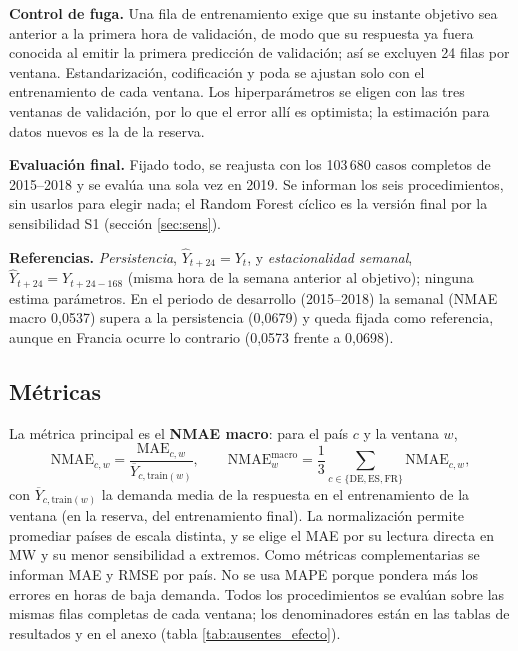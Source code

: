 \begin{table}[!htbp]
    \centering
        \caption{Ventanas de validación temporal y tamaños (casos completos, suma de los tres países).}
        \label{tab:ventanas}
        \small
        
\end{table}

\textbf{Control de fuga.} Una fila de entrenamiento exige que su instante objetivo sea anterior a la primera hora de validación, de modo que su respuesta ya fuera conocida al emitir la primera predicción de validación; así se excluyen 24 filas por ventana. Estandarización, codificación y poda se ajustan solo con el entrenamiento de cada ventana. Los hiperparámetros se eligen con las tres ventanas de validación, por lo que el error allí es optimista; la estimación para datos nuevos es la de la reserva.

\textbf{Evaluación final.} Fijado todo, se reajusta con los 103\,680 casos completos de 2015--2018 y se evalúa una sola vez en 2019. Se informan los seis procedimientos, sin usarlos para elegir nada; el Random Forest cíclico es la versión final por la sensibilidad S1 (sección \ref{sec:sens}).

\textbf{Referencias.} \emph{Persistencia}, $\widehat Y_{t+24}=Y_t$, y \emph{estacionalidad semanal}, $\widehat Y_{t+24}=Y_{t+24-168}$ (misma hora de la semana anterior al objetivo); ninguna estima parámetros. En el periodo de desarrollo (2015--2018) la semanal (NMAE macro 0,0537) supera a la persistencia (0,0679) y queda fijada como referencia, aunque en Francia ocurre lo contrario (0,0573 frente a 0,0698).

\subsection{Métricas}

La métrica principal es el \textbf{NMAE macro}: para el país $c$ y la ventana $w$,
\begin{equation}
    \mathrm{NMAE}_{c,w}=\frac{\mathrm{MAE}_{c,w}}{\overline{Y}_{c,\mathrm{train}(w)}},\qquad
    \mathrm{NMAE}^{\mathrm{macro}}_{w}=\frac{1}{3}\sum_{c\in\{\mathrm{DE},\mathrm{ES},\mathrm{FR}\}}\mathrm{NMAE}_{c,w},
\end{equation}
con $\overline{Y}_{c,\mathrm{train}(w)}$ la demanda media de la respuesta en el entrenamiento de la ventana (en la reserva, del entrenamiento final). La normalización permite promediar países de escala distinta, y se elige el MAE por su lectura directa en MW y su menor sensibilidad a extremos. Como métricas complementarias se informan MAE y RMSE por país. No se usa MAPE porque pondera más los errores en horas de baja demanda. Todos los procedimientos se evalúan sobre las mismas filas completas de cada ventana; los denominadores están en las tablas de resultados y en el anexo (tabla \ref{tab:ausentes_efecto}).

